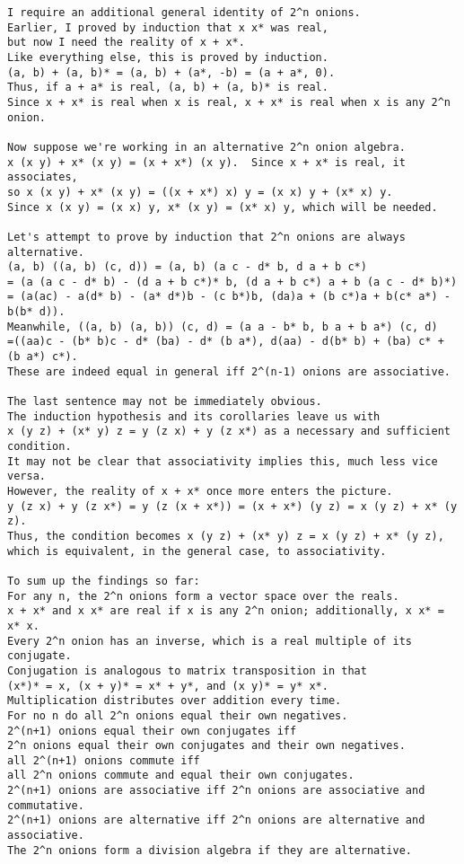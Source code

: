 \begin{verbatim}
I require an additional general identity of 2^n onions.
Earlier, I proved by induction that x x* was real,
but now I need the reality of x + x*.
Like everything else, this is proved by induction.
(a, b) + (a, b)* = (a, b) + (a*, -b) = (a + a*, 0).
Thus, if a + a* is real, (a, b) + (a, b)* is real.
Since x + x* is real when x is real, x + x* is real when x is any 2^n onion.

Now suppose we're working in an alternative 2^n onion algebra.
x (x y) + x* (x y) = (x + x*) (x y).  Since x + x* is real, it associates,
so x (x y) + x* (x y) = ((x + x*) x) y = (x x) y + (x* x) y.
Since x (x y) = (x x) y, x* (x y) = (x* x) y, which will be needed.

Let's attempt to prove by induction that 2^n onions are always alternative.
(a, b) ((a, b) (c, d)) = (a, b) (a c - d* b, d a + b c*)
= (a (a c - d* b) - (d a + b c*)* b, (d a + b c*) a + b (a c - d* b)*)
= (a(ac) - a(d* b) - (a* d*)b - (c b*)b, (da)a + (b c*)a + b(c* a*) - b(b* d)).
Meanwhile, ((a, b) (a, b)) (c, d) = (a a - b* b, b a + b a*) (c, d)
=((aa)c - (b* b)c - d* (ba) - d* (b a*), d(aa) - d(b* b) + (ba) c* + (b a*) c*).
These are indeed equal in general iff 2^(n-1) onions are associative.

The last sentence may not be immediately obvious.
The induction hypothesis and its corollaries leave us with
x (y z) + (x* y) z = y (z x) + y (z x*) as a necessary and sufficient condition.
It may not be clear that associativity implies this, much less vice versa.
However, the reality of x + x* once more enters the picture.
y (z x) + y (z x*) = y (z (x + x*)) = (x + x*) (y z) = x (y z) + x* (y z).
Thus, the condition becomes x (y z) + (x* y) z = x (y z) + x* (y z),
which is equivalent, in the general case, to associativity.

To sum up the findings so far:
For any n, the 2^n onions form a vector space over the reals.
x + x* and x x* are real if x is any 2^n onion; additionally, x x* = x* x.
Every 2^n onion has an inverse, which is a real multiple of its conjugate.
Conjugation is analogous to matrix transposition in that
(x*)* = x, (x + y)* = x* + y*, and (x y)* = y* x*.
Multiplication distributes over addition every time.
For no n do all 2^n onions equal their own negatives.
2^(n+1) onions equal their own conjugates iff
2^n onions equal their own conjugates and their own negatives.
all 2^(n+1) onions commute iff
all 2^n onions commute and equal their own conjugates.
2^(n+1) onions are associative iff 2^n onions are associative and commutative.
2^(n+1) onions are alternative iff 2^n onions are alternative and associative.
The 2^n onions form a division algebra if they are alternative.


\end{verbatim}
